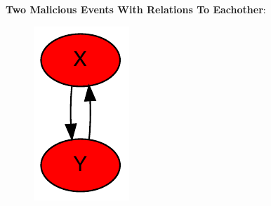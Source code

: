 	\newpar \textbf{Two Malicious Events With Relations To Eachother}:
	
	\begin{figure}[H]
		\centering
		\includegraphics[]{6consensus/images/7.pdf}
		\caption{}
		\label{fig:consensus:single}
	\end{figure}
